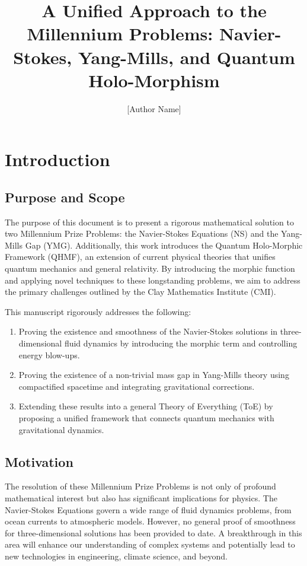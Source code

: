 \documentclass{article}
\title{A Unified Approach to the Millennium Problems: Navier-Stokes, Yang-Mills, and Quantum Holo-Morphism}
\author{[Author Name]}
\date{}
\begin{document}
\maketitle

\section{Introduction}

\subsection{Purpose and Scope}

The purpose of this document is to present a rigorous mathematical solution to two Millennium Prize Problems: the Navier-Stokes Equations (NS) and the Yang-Mills Gap (YMG). Additionally, this work introduces the Quantum Holo-Morphic Framework (QHMF), an extension of current physical theories that unifies quantum mechanics and general relativity. By introducing the morphic function and applying novel techniques to these longstanding problems, we aim to address the primary challenges outlined by the Clay Mathematics Institute (CMI).

This manuscript rigorously addresses the following:
\begin{enumerate}
    \item Proving the existence and smoothness of the Navier-Stokes solutions in three-dimensional fluid dynamics by introducing the morphic term and controlling energy blow-ups.
    \item Proving the existence of a non-trivial mass gap in Yang-Mills theory using compactified spacetime and integrating gravitational corrections.
    \item Extending these results into a general Theory of Everything (ToE) by proposing a unified framework that connects quantum mechanics with gravitational dynamics.
\end{enumerate}

\subsection{Motivation}

The resolution of these Millennium Prize Problems is not only of profound mathematical interest but also has significant implications for physics. The Navier-Stokes Equations govern a wide range of fluid dynamics problems, from ocean currents to atmospheric models. However, no general proof of smoothness for three-dimensional solutions has been provided to date. A breakthrough in this area will enhance our understanding of complex systems and potentially lead to new technologies in engineering, climate science, and beyond.
\end{document}

